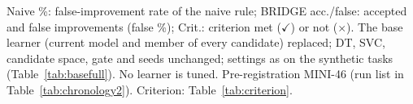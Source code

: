 \begin{table}[!htb]
\vspace{2pt}
\parbox{\linewidth}{\justifying\scriptsize *Naive \%: false-improvement rate of the naive rule; BRIDGE acc./false: accepted and false improvements (false \%); Crit.: criterion met ($\checkmark$) or not ($\times$). The base learner (current model and member of every candidate) replaced; DT, SVC, candidate space, gate and seeds unchanged; settings as on the synthetic tasks (Table~\ref{tab:basefull}). No learner is tuned. Pre-registration MINI-46 (run list in Table~\ref{tab:chronology2}). Criterion: Table~\ref{tab:criterion}.}
\end{table}
